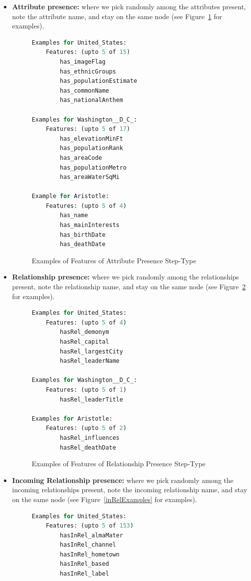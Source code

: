 \documentclass[runningheads,a4paper]{IEEEtran}
\begin{document}
  \begin{itemize}
     \item \textbf{Attribute presence:} where we pick randomly among the attributes present, note the attribute name, and stay on the same node (see Figure~\ref{attrExamples} for examples).
\begin{figure}[t]
\begin{lstlisting}[language=Python,basicstyle=\tiny, frame=single]
Examples for United_States: 
	Features: (upto 5 of 15)
		has_imageFlag
		has_ethnicGroups
		has_populationEstimate
		has_commonName
		has_nationalAnthem

Examples for Washington__D_C_: 
	Features: (upto 5 of 17)
		has_elevationMinFt
		has_populationRank
		has_areaCode
		has_populationMetro
		has_areaWaterSqMi

Example for Aristotle: 
	Features: (upto 5 of 4)
		has_name
		has_mainInterests
		has_birthDate
		has_deathDate
\end{lstlisting}
\caption{Examples of Features of Attribute Presence Step-Type}
\label{attrExamples}
\end{figure}

     \item \textbf{Relationship presence:} where we pick randomly among the relationships present,  note the relationship name,  and stay on the same node (see Figure~\ref{relExamples} for examples).
\begin{figure}[t]
\begin{lstlisting}[language=Python,basicstyle=\tiny, frame=single]
Examples for United_States: 
	Features: (upto 5 of 4)
		hasRel_demonym
		hasRel_capital
		hasRel_largestCity
		hasRel_leaderName

Examples for Washington__D_C_: 
	Features: (upto 5 of 1)
		hasRel_leaderTitle

Examples for Aristotle: 
	Features: (upto 5 of 2)
		hasRel_influences
		hasRel_deathDate
\end{lstlisting}
\caption{Examples of Features of Relationship Presence Step-Type}
\label{relExamples}
\end{figure}

     \item \textbf{Incoming Relationship presence:} where we pick randomly among the incoming relationships present, note the incoming relationship name,  and stay on the same node (see Figure~\ref{inRelExamples} for examples).
\begin{figure}[t]
\begin{lstlisting}[language=Python,basicstyle=\tiny, frame=single]
Examples for United_States: 
	Features: (upto 5 of 153)
		hasInRel_almaMater
		hasInRel_channel
		hasInRel_hometown
		hasInRel_based
		hasInRel_label


\end{lstlisting}
\end{figure}
\end{itemize}
\end{document}
